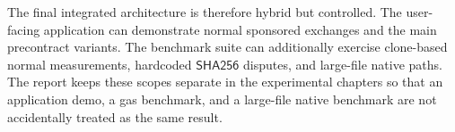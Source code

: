 The final integrated architecture is therefore hybrid but controlled. The user-facing
application can demonstrate normal sponsored exchanges and the main precontract variants.
The benchmark suite can additionally exercise clone-based normal measurements, hardcoded
\(\mathsf{SHA256}\) disputes, and large-file native paths. The report keeps these scopes
separate in the experimental chapters so that an application demo, a gas benchmark, and a
large-file native benchmark are not accidentally treated as the same result.
